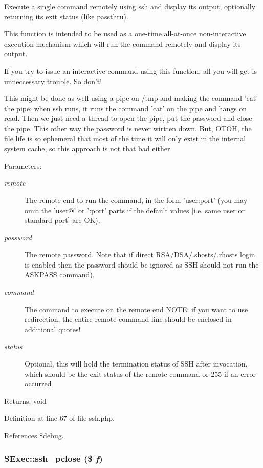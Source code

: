 Execute a single command remotely using ssh and display its output, optionally returning its exit status (like passthru). 

This function is intended to be used as a one-time all-at-once non-interactive execution mechanism which will run the command remotely and display its output.

If you try to issue an interactive command using this function, all you will get is unneccessary trouble. So don't!

This might be done as well using a pipe on /tmp and making the command 'cat' the pipe: when ssh runs, it runs the command 'cat' on the pipe and hangs on read. Then we just need a thread to open the pipe, put the password and close the pipe. This other way the password is never wirtten down. But, OTOH, the file life is so ephemeral that most of the time it will only exist in the internal system cache, so this approach is not that bad either.

\begin{Desc}
\item[Parameters:]
\begin{description}
\item[{\em remote}]The remote end to run the command, in the form 'user:port' (you may omit the 'user@' or ':port' parts if the default values [i.e. same user or standard port] are OK). \item[{\em password}]The remote password. Note that if direct RSA/DSA/.shosts/.rhosts login is enabled then the password should be ignored as SSH should not run the ASKPASS command). \item[{\em command}]The command to execute on the remote end NOTE: if you want to use redirection, the entire remote command line should be enclosed in additional quotes! \item[{\em status}]Optional, this will hold the termination status of SSH after invocation, which should be the exit status of the remote command or 255 if an error occurred \end{description}
\end{Desc}
\begin{Desc}
\item[Returns:]void \end{Desc}


Definition at line 67 of file ssh.php.

References \$debug.
\subsubsection{\setlength{\rightskip}{0pt plus 5cm}SExec::ssh\_\-pclose (\$ {\em f})}\label{classSExec_a10}




